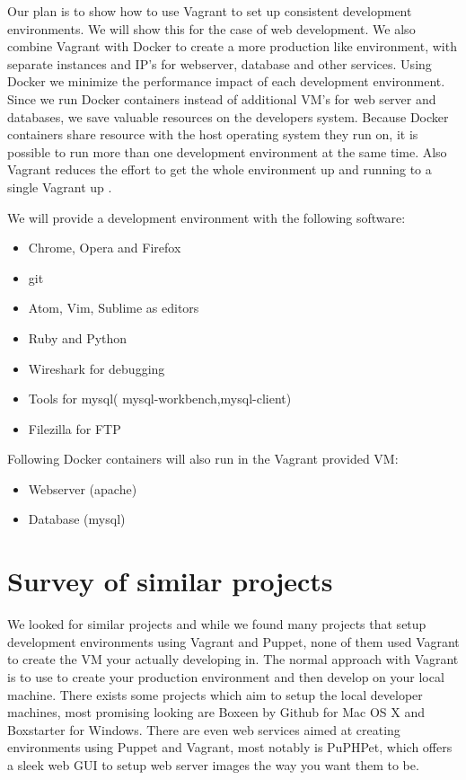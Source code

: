 Our plan is to show how to use Vagrant to set up consistent development environments. We will show this for the case of web development. We also combine Vagrant with Docker to create a more production like environment, with separate instances and IP's for webserver, database and other services. Using Docker we minimize the performance impact of each development environment. Since we run Docker containers instead of additional \gls{VM}'s for web server and databases, we save valuable resources on the developers system. Because Docker containers share resource with the host operating system they run on, it is possible to run more than one development environment at the same time. Also Vagrant reduces the effort to get the whole environment up and running to a single Vagrant up .

We will provide a development environment with the following software:

\begin{itemize}
\item Chrome, Opera and Firefox
\item git
\item Atom, Vim, Sublime as editors
\item Ruby and Python
\item Wireshark for debugging
\item Tools for mysql( mysql-workbench,mysql-client)
\item Filezilla for FTP 
\end{itemize}
Following Docker containers will also run in the Vagrant provided \gls{VM}:
\begin{itemize}
\item Webserver (apache)
\item Database (mysql)
\end{itemize}

\section{Survey of similar projects}

We looked for similar projects and while we found many projects that setup development environments using Vagrant and Puppet, none of them used Vagrant to create the \gls{VM} your actually developing in. The normal approach with Vagrant is to use to create your production environment and then develop on your local machine. There exists some projects which aim to setup the local developer machines, most promising looking are Boxeen by Github for Mac OS X and Boxstarter for Windows. 
There are even web services aimed at creating environments using Puppet and Vagrant, most notably is PuPHPet, which offers a sleek web GUI to setup web server images the way you want them to be.

